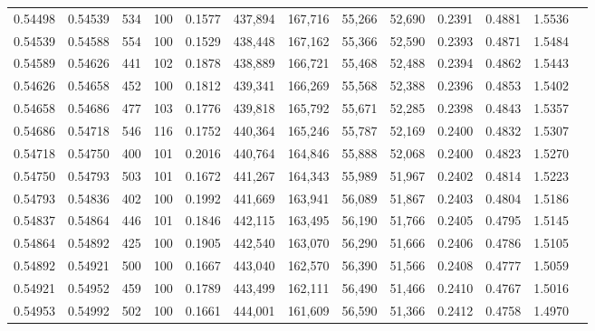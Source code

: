 \begin{tabular}{rrrrrrrrrrrrr}
0.54498 & 0.54539 &   534 & 100 &                                     0.1577 & 437,894 & 167,716 &  55,266 &  52,690 & 0.2391 & 0.4881 & 1.5536 \\
0.54539 & 0.54588 &   554 & 100 &                                     0.1529 & 438,448 & 167,162 &  55,366 &  52,590 & 0.2393 & 0.4871 & 1.5484 \\
0.54589 & 0.54626 &   441 & 102 &                                     0.1878 & 438,889 & 166,721 &  55,468 &  52,488 & 0.2394 & 0.4862 & 1.5443 \\
0.54626 & 0.54658 &   452 & 100 &                                     0.1812 & 439,341 & 166,269 &  55,568 &  52,388 & 0.2396 & 0.4853 & 1.5402 \\
0.54658 & 0.54686 &   477 & 103 &                                     0.1776 & 439,818 & 165,792 &  55,671 &  52,285 & 0.2398 & 0.4843 & 1.5357 \\
0.54686 & 0.54718 &   546 & 116 &                                     0.1752 & 440,364 & 165,246 &  55,787 &  52,169 & 0.2400 & 0.4832 & 1.5307 \\
0.54718 & 0.54750 &   400 & 101 &                                     0.2016 & 440,764 & 164,846 &  55,888 &  52,068 & 0.2400 & 0.4823 & 1.5270 \\
0.54750 & 0.54793 &   503 & 101 &                                     0.1672 & 441,267 & 164,343 &  55,989 &  51,967 & 0.2402 & 0.4814 & 1.5223 \\
0.54793 & 0.54836 &   402 & 100 &                                     0.1992 & 441,669 & 163,941 &  56,089 &  51,867 & 0.2403 & 0.4804 & 1.5186 \\
0.54837 & 0.54864 &   446 & 101 &                                     0.1846 & 442,115 & 163,495 &  56,190 &  51,766 & 0.2405 & 0.4795 & 1.5145 \\
0.54864 & 0.54892 &   425 & 100 &                                     0.1905 & 442,540 & 163,070 &  56,290 &  51,666 & 0.2406 & 0.4786 & 1.5105 \\
0.54892 & 0.54921 &   500 & 100 &                                     0.1667 & 443,040 & 162,570 &  56,390 &  51,566 & 0.2408 & 0.4777 & 1.5059 \\
0.54921 & 0.54952 &   459 & 100 &                                     0.1789 & 443,499 & 162,111 &  56,490 &  51,466 & 0.2410 & 0.4767 & 1.5016 \\
0.54953 & 0.54992 &   502 & 100 &                                     0.1661 & 444,001 & 161,609 &  56,590 &  51,366 & 0.2412 & 0.4758 & 1.4970 \\

\end{tabular}
